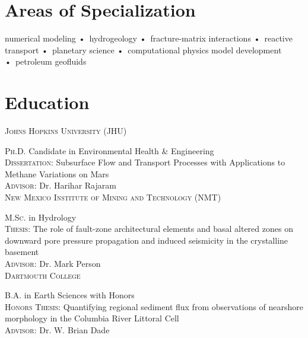 \documentclass[11pt, letterpaper]{article}
\newcommand{\years}[1]{\marginnote{\scriptsize #1}}
\begin{document}

\section*{Areas of Specialization}
\begin{center}
    numerical modeling •\ hydrogeology •\ fracture-matrix interactions •\
    reactive transport •\ planetary science •\ computational physics model
    development •\ petroleum geofluids
\end{center}

\section*{Education}
\noindent

\years{Current}\textsc{Johns Hopkins University (JHU)}

	\textsc{Ph.D.} Candidate in Environmental Health \& Engineering \\
    \textsc{Dissertation:} Subsurface Flow and Transport Processes with
    Applications to Methane Variations on Mars\\
    \textsc{Advisor:} Dr. Harihar Rajaram \\

\years{2017}\textsc{New Mexico Institute of Mining and Technology (NMT)}

	\textsc{M.Sc.} in Hydrology\\ %
	\textsc{Thesis:} The role of fault-zone architectural elements and basal
	altered zones on downward pore pressure propagation and induced seismicity
	in the crystalline basement\\
    \textsc{Advisor:} Dr. Mark Person\\

\years{2014}\textsc{Dartmouth College}

	\textsc{B.A.} in Earth Sciences with Honors\\
    \textsc{Honors Thesis:} Quantifying regional sediment flux from
    observations of nearshore morphology in the Columbia River Littoral Cell\\
    \textsc{Advisor:} Dr. W. Brian Dade
\end{document}
